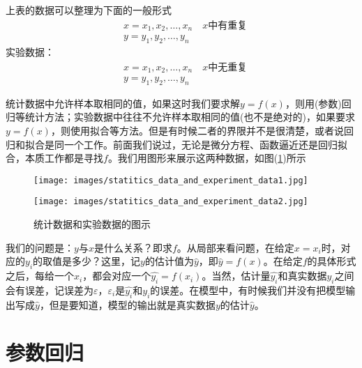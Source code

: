     上表的数据可以整理为下面的一般形式
    \begin{align*}
    &x = x_1,x_2,\dots,x_n \quad x\text{中有重复}\\
    &y = y_1,y_2,\dots,y_n
    \end{align*}
    实验数据：
    \begin{align*}
    &x = x_1,x_2,\dots,x_n \quad x\text{中无重复}\\
    &y = y_1,y_2,\dots,y_n
    \end{align*}
    \par
    统计数据中允许样本取相同的值，如果这时我们要求解$y = f(x)$，则用(参数)回归等统计方法；实验数据中往往不允许样本取相同的值(也不是绝对的)，如果要求$y = f(x)$，则使用拟合等方法。但是有时候二者的界限并不是很清楚，或者说回归和拟合是同一个工作。前面我们说过，无论是微分方程、函数逼近还是回归拟合，本质工作都是寻找$f$。我们用图形来展示这两种数据，如图(\ref{fig:统计数据和实验数据的图示})所示
    \begin{figure}[H]
      \centering
      \begin{varwidth}[t]{\textwidth}
        \vspace{0pt}
        \texttt{[image: images/statitics\_data\_and\_experiment\_data1.jpg]}
      \end{varwidth}
      \qquad \qquad
      \begin{varwidth}[t]{\textwidth}
        \vspace{0pt}
        \texttt{[image: images/statitics\_data\_and\_experiment\_data2.jpg]}
      \end{varwidth}
    \caption{统计数据和实验数据的图示}
    \label{fig:统计数据和实验数据的图示}
    \end{figure}
    \par
    我们的问题是：$y$与$x$是什么关系？即求$f$。从局部来看问题，在给定$x = x_i$时，对应的$y_i$的取值是多少？这里，记$y$的估计值为$\hat{y}$，即$\hat{y} = f(x)$。在给定$f$的具体形式之后，每给一个$x_i$，都会对应一个$\hat{y_i} = f(x_i)$。当然，估计量$\hat{y_i}$和真实数据$y_i$之间会有误差，记误差为$\varepsilon$，$\varepsilon_i$是$\hat{y_i}$和$y_i$的误差。在模型中，有时候我们并没有把模型输出写成$\hat{y}$，但是要知道，模型的输出就是真实数据$y$的估计$\hat{y}$。
\section{参数回归}
